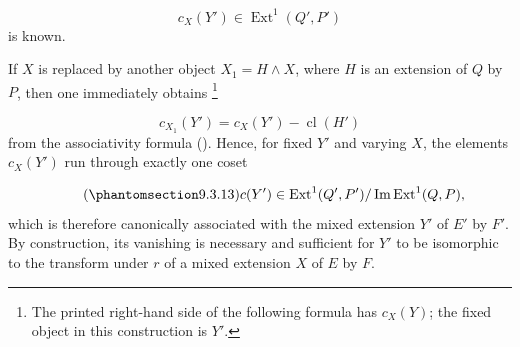 \begin{equation*}
c_X(Y')\in\operatorname{Ext}^1(Q',P')
\end{equation*}
is known.

If $X$ is replaced by another object $X_1=H\wedge X$, where $H$ is an
extension of $Q$ by $P$, then one immediately obtains
\footnote{The printed right-hand side of the following formula has
$c_X(Y)$; the fixed object in this construction is $Y'$.}

\begin{equation*}
c_{X_1}(Y')=c_X(Y')-\operatorname{cl}(H')
\end{equation*}
from the associativity formula (). Hence, for fixed $Y'$ and varying
$X$, the elements $c_X(Y')$ run through exactly one coset

\begin{equation}\tag{\SGARefTarget{sga7.sga7i.eix.n9-3-13}{9.3.13}}
c(Y')\in
\operatorname{Ext}^1(Q',P')/
\operatorname{Im}\operatorname{Ext}^1(Q,P),
\end{equation}
which is therefore canonically associated with the mixed extension $Y'$ of
$E'$ by $F'$. By construction, its vanishing is necessary and sufficient
for $Y'$ to be isomorphic to the transform under $r$ of a mixed extension
$X$ of $E$ by $F$.
